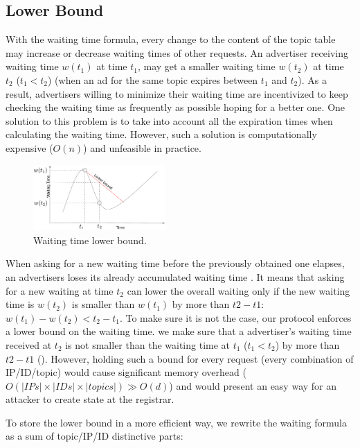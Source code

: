\subsection{Lower Bound}
With the waiting time formula, every change to the content of the topic table may increase or decrease waiting times of other requests. An advertiser receiving waiting time $w(t_1)$ at time $t_1$, may get a smaller waiting time $w(t_2)$ at time $t_2$ ($t_1 < t_2$) (\eg when an ad for the same topic expires between $t_1$ and $t_2$). As a result, advertisers willing to minimize their waiting time are incentivized to keep checking the waiting time as frequently as possible hoping for a better one.
One solution to this problem is to take into account all the expiration times when calculating the waiting time. However, such a solution is computationally expensive (\eg $O(n)$) and unfeasible in practice.

\begin{figure}
    \includegraphics[width=0.45\textwidth]{img/lower_bound.png}
    \caption{Waiting time lower bound.}
    \label{fig:lower_bound}
\end{figure}

When asking for a new waiting time before the previously obtained one elapses, an advertisers loses its already accumulated waiting time . It means that asking for a new waiting at time $t_2$ can lower the overall waiting only if the new waiting time is $w(t_2)$ is smaller than $w(t_1)$ by more than $t2 - t1$: $w(t_1) - w(t_2) < t_2 - t_1$.
To make sure it is not the case, our protocol enforces a lower bound on the waiting time. \Ie we make sure that a advertiser's waiting time received at $t_2$ is not smaller than the waiting time at $t_1$ ($t_1 < t_2$) by more than $t2 - t1$ (). However, holding such a bound for every request (\ie every combination of IP/ID/topic) would cause significant memory overhead ($O(|IPs|\times|IDs|\times|topics|)  \gg O(d)$) and would present an easy way for an attacker to create state at the registrar. 

To store the lower bound in a more efficient way, we rewrite the waiting formula as a sum of topic/IP/ID distinctive parts:

